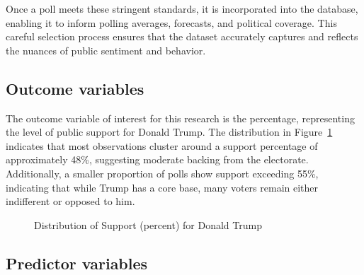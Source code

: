 \documentclass[
  letterpaper,
  DIV=11,
  numbers=noendperiod]{scrartcl}
\begin{document}
Once a poll meets these stringent standards, it is incorporated into the
database, enabling it to inform polling averages, forecasts, and
political coverage. This careful selection process ensures that the
dataset accurately captures and reflects the nuances of public sentiment
and behavior.

\subsection{Outcome variables}\label{outcome-variables}

The outcome variable of interest for this research is the percentage,
representing the level of public support for Donald Trump. The
distribution in Figure~\ref{fig-pct} indicates that most observations
cluster around a support percentage of approximately 48\%, suggesting
moderate backing from the electorate. Additionally, a smaller proportion
of polls show support exceeding 55\%, indicating that while Trump has a
core base, many voters remain either indifferent or opposed to him.

\begin{figure}


\caption{\label{fig-pct}Distribution of Support (percent) for Donald
Trump}

\end{figure}%

\subsection{Predictor variables}\label{predictor-variables}
\end{document}
